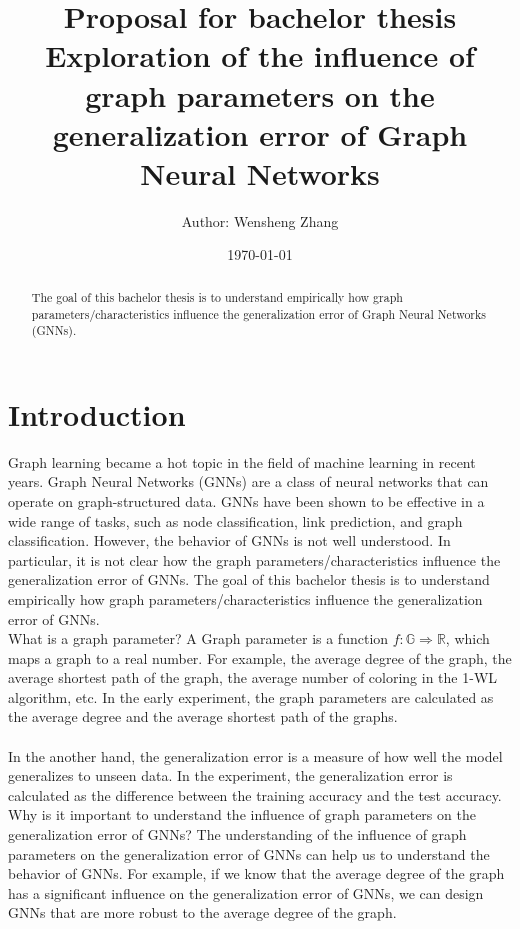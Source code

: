 \documentclass{article}
\title{\textbf{Proposal for bachelor thesis}\\
Exploration of the influence of graph parameters on the generalization error of Graph Neural Networks}
\author{Author: Wensheng Zhang}
\date{\today}
\begin{document}
 

\maketitle

\tableofcontents


\begin{abstract}
The goal of this bachelor thesis is to understand empirically how graph parameters/characteristics influence the generalization error of Graph Neural Networks (GNNs).
\end{abstract}


\section{Introduction}

Graph learning became a hot topic in the field of machine learning in recent years. Graph Neural Networks (GNNs) are a class of neural networks that can operate on graph-structured data. GNNs have been shown to be effective in a wide range of tasks, such as node classification, link prediction, and graph classification. However, the behavior of GNNs is not well understood. In particular, it is not clear how the graph parameters/characteristics influence the generalization error of GNNs. The goal of this bachelor thesis is to understand empirically how graph parameters/characteristics influence the generalization error of GNNs. 
\\

What is a graph parameter?  A Graph parameter is a function $f: \mathbb{G} \Rightarrow \mathbb{R}$, which maps a graph to a real number. For example, the average degree of the graph, the average shortest path of the graph, the average number of coloring in the 1-WL algorithm, etc. In the early experiment, the graph parameters are calculated as the average degree and the average shortest path of the graphs.
\\

\\
In the another hand, the generalization error is a measure of how well the model generalizes to unseen data. In the experiment, the generalization error is calculated as the difference between the training accuracy and the test accuracy.
\\
Why is it important to understand the influence of graph parameters on the generalization error of GNNs? The understanding of the influence of graph parameters on the generalization error of GNNs can help us to understand the behavior of GNNs. For example, if we know that the average degree of the graph has a significant influence on the generalization error of GNNs, we can design GNNs that are more robust to the average degree of the graph.
\end{document}
